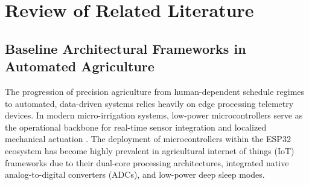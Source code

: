 
\chapter{Review of Related Literature}
\label{chap:literature}

\ifpdf
    \graphicspath{{Chapter2/Figs/Raster/}{Chapter2/Figs/PDF/}{Chapter2/Figs/}}
\else
    \graphicspath{{Chapter2/Figs/Vector/}{Chapter2/Figs/}}
\fi

\section{Baseline Architectural Frameworks in Automated Agriculture}

The progression of precision agriculture from human-dependent schedule regimes to automated, data-driven systems relies heavily on edge processing telemetry devices. In modern micro-irrigation systems, low-power microcontrollers serve as the operational backbone for real-time sensor integration and localized mechanical actuation \cite{Prathibha2017}. The deployment of microcontrollers within the ESP32 ecosystem has become highly prevalent in agricultural internet of things (IoT) frameworks due to their dual-core processing architectures, integrated native analog-to-digital converters (ADCs), and low-power deep sleep modes.

